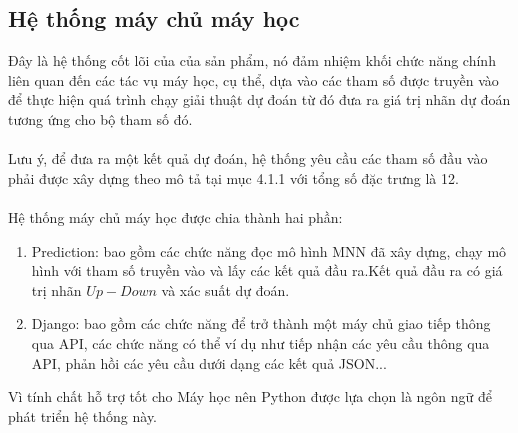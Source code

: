\subsection{Hệ thống máy chủ máy học}
Đây là hệ thống cốt lõi của của sản phẩm, nó đảm nhiệm khối chức năng chính 
liên quan đến các tác vụ máy học, cụ thể, dựa vào các tham số được truyền vào 
để thực hiện quá trình chạy giải thuật dự đoán từ đó đưa ra giá trị nhãn dự 
đoán tương ứng cho bộ tham số đó.\\\\
Lưu ý, để đưa ra một kết quả dự đoán, hệ thống yêu cầu các tham số đầu vào phải 
được xây dựng theo mô tả tại mục 4.1.1 với tổng số đặc trưng là 12.\\\\
Hệ thống máy chủ máy học được chia thành hai phần:
\begin{enumerate}
\item Prediction: bao gồm các chức năng đọc mô hình MNN đã xây dựng, chạy mô 
hình với tham số truyền vào và lấy các kết quả đầu ra.Kết quả đầu ra có giá 
trị nhãn $Up-Down$ và xác suất dự đoán.
\item Django: bao gồm các chức năng để trở thành một máy chủ giao tiếp thông 
qua API, các chức năng có thể ví dụ như tiếp nhận các yêu cầu thông qua API, 
phản hồi các yêu cầu dưới dạng các kết quả JSON...
\end{enumerate}
Vì tính chất hỗ trợ tốt cho Máy học nên Python được lựa chọn là ngôn ngữ để 
phát triển hệ thống này.
